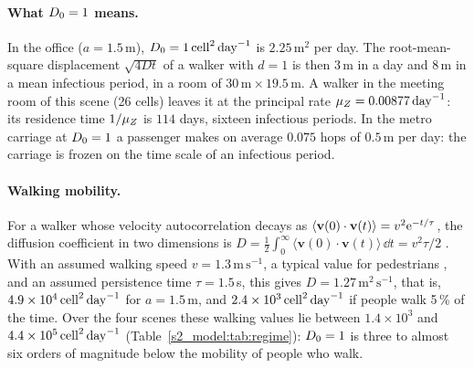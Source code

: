 \paragraph{What $D_0=1$ means.} In the office ($a=1.5$\,m), $D_0=1\,\mathrm{cell}^2\,\mathrm{day}^{-1}$ is $2.25\,\mathrm{m}^2$ per day.
The root-mean-square displacement $\sqrt{4Dt}$ of a walker with $d=1$ is then $3$\,m in a day and $8$\,m in a
mean infectious period, in a room of $30\,\mathrm{m}\times19.5\,\mathrm{m}$. A walker in the meeting room of
this scene (26 cells) leaves it at the principal rate $\mu_Z=0.00877\,\mathrm{day}^{-1}$: its residence time $1/\mu_Z$ is
$114$ days, sixteen infectious periods. In the metro carriage at $D_0=1$ a passenger makes on average $0.075$
hops of $0.5$\,m per day: the carriage is frozen on the time scale of an infectious period.

\paragraph{Walking mobility.} For a walker whose velocity autocorrelation decays as
$\langle\mathbf{v}(0)\cdot\mathbf{v}(t)\rangle=v^2\mathrm{e}^{-t/\tau}$, the diffusion coefficient in two dimensions
is $D=\tfrac12\int_0^\infty\langle\mathbf{v}(0)\cdot\mathbf{v}(t)\rangle\,\dd t=v^2\tau/2$
\citep{taylor1922diffusion,kubo1966fluctuation}. With an assumed walking speed $v=1.3\,\mathrm{m\,s^{-1}}$, a
typical value for pedestrians \citep{weidmann1993transporttechnik}, and an assumed persistence time
$\tau=1.5$\,s, this gives $D=1.27\,\mathrm{m^2\,s^{-1}}$, that is, $4.9\times10^{4}\,\mathrm{cell}^2\,\mathrm{day}^{-1}$ for $a=1.5$\,m,
and $2.4\times10^{3}\,\mathrm{cell}^2\,\mathrm{day}^{-1}$ if people walk 5\,\% of the time. Over the four scenes these walking values lie
between $1.4\times10^{3}$ and $4.4\times10^{5}\,\mathrm{cell}^2\,\mathrm{day}^{-1}$ (Table~\ref{s2_model:tab:regime}): $D_0=1$ is three to
almost six orders of magnitude below the mobility of people who walk.

